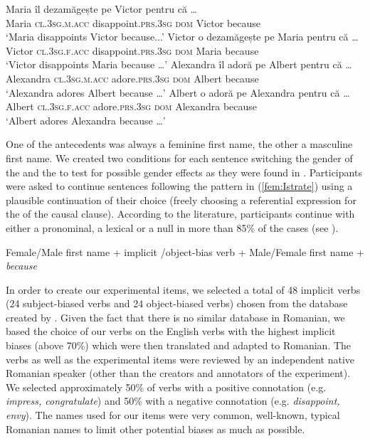 \documentclass[output=paper,colorlinks,citecolor=brown]{langscibook}
\begin{document}
\ea \label{romanian_ic:Istrate}
\ea \gll Maria îl dezamăgește pe Victor {pentru că} \ldots \\
Maria \textsc{cl.3sg.m.acc} disappoint.\textsc{prs.3sg} \textsc{dom} Victor because \\
\glt `Maria disappoints Victor because...’ \label{dezamm:Istrate}
\ex \gll Victor o dezamăgește pe Maria {pentru că} \ldots \\
Victor \textsc{cl.3sg.f.acc} disappoint.\textsc{prs.3sg} \textsc{dom} Maria because \\
\glt `Victor disappoints Maria because \ldots’ \label{dezamv:Istrate}
\ex \gll Alexandra îl adoră pe Albert {pentru că} \ldots \\
Alexandra \textsc{cl.3sg.m.acc} adore.\textsc{prs.3sg} \textsc{dom} Albert because \\
\glt `Alexandra adores Albert because \ldots’ \label{aleador:Istrate}
\ex \gll Albert o adoră pe Alexandra {pentru că} \ldots \\
Albert \textsc{cl.3sg.f.acc} adore.\textsc{prs.3sg} \textsc{dom} Alexandra because \\
\glt `Albert adores Alexandra because \ldots’ \label{albador:Istrate}
\z \z

One of the antecedents was always a feminine first name, the other a masculine first name. We created two conditions for each sentence switching the gender of the  and the  to test for possible gender effects as they were found in \citet{ferstl2011implicit}. Participants were asked to continue sentences following the pattern in (\ref{fem:Istrate}) using a plausible continuation of their choice (freely  choosing a referential expression for the  of the causal clause). According to the literature, participants continue with either a pronominal, a lexical or a null  in more than 85\% of the cases (see \citealt{kehler2019prominence}).

\ea Female/Male first name + implicit  /object-bias verb + Male/Female first name + \textit{because}
\label{fem:Istrate}
\z

In order to create our experimental items, we selected a total of 48 implicit  verbs (24 subject-biased verbs and 24 object-biased verbs) chosen from the database created by \citet{ferstl2011implicit}. Given the fact that there is no similar database in Romanian, we based the choice of our verbs on the English verbs with the highest implicit  biases (above 70\%) which were then  translated and adapted to Romanian. The verbs as well as the experimental items were reviewed by an independent native Romanian speaker (other than the creators and annotators of the experiment). We selected approximately 50\% of verbs with a positive connotation (e.g. \textit{impress, congratulate}) and 50\% with a negative connotation (e.g. \textit{disappoint, envy}). The names used for our items were very common, well-known, typical Romanian names to limit other potential biases as much as possible. 
\end{document}
